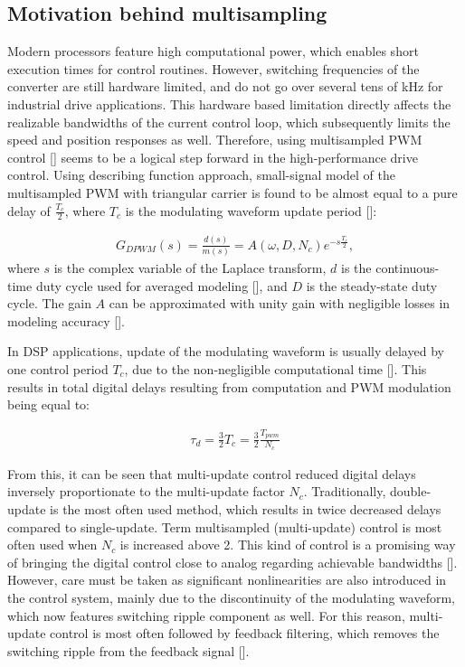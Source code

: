 \documentclass[journal]{IEEEtran}
\begin{document}
\subsection{Motivation behind multisampling}

Modern processors feature high computational power, which enables short execution times for control routines. However, switching frequencies of the converter are still hardware limited, and do not go over several tens of kHz for industrial drive applications. This hardware based limitation directly affects the realizable bandwidths of the current control loop, which subsequently limits the speed and position responses as well. Therefore, using multisampled PWM control [] seems to be a logical step forward in the high-performance drive control. 
Using describing function approach, small-signal model of the multisampled PWM with triangular carrier is found to be almost equal to a pure delay of $\frac{T_c}{2}$, where $T_c$ is the modulating waveform update period []:

\begin{equation}
\begin{aligned}
G_{DPWM} (s) = \frac{d(s)}{m(s)} = A(\omega,D,N_c) e^{-s\frac{T_c}{2}},
\label{eq:DPWM} 
\end{aligned}    
\end{equation}
where $s$ is the complex variable of the Laplace transform, $d$ is the continuous-time duty cycle used for averaged modeling [], and $D$ is the steady-state duty cycle. The gain $A$ can be approximated with unity gain with negligible losses in modeling accuracy [].

In DSP applications, update of the modulating waveform is usually delayed by one control period $T_c$, due to the non-negligible computational time []. This results in total digital delays resulting from computation and PWM modulation being equal to:

\begin{equation}
\begin{aligned}
\tau_{d} = \frac{3}{2}T_c = \frac{3}{2} \frac{T_{pwm}}{N_c}
\label{eq:tauD} 
\end{aligned}    
\end{equation}

From this, it can be seen that multi-update control reduced digital delays inversely proportionate to the multi-update factor $N_c$. Traditionally, double-update is the most often used method, which results in twice decreased delays compared to single-update.
Term multisampled (multi-update) control is most often used when $N_c$ is increased above 2. This kind of control is a promising way of bringing the digital control close to analog regarding achievable bandwidths []. However, care must be taken as significant nonlinearities are also introduced in the control system, mainly due to the discontinuity of the modulating waveform, which now features switching ripple component as well. For this reason, multi-update control is most often followed by feedback filtering, which removes the switching ripple from the feedback signal []. 
\end{document}
